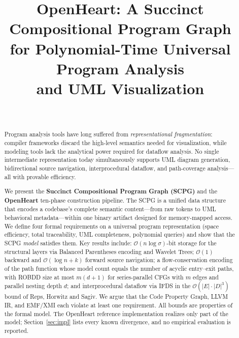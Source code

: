 \documentclass[journal,10pt,twoside]{IEEEtran}
\newcommand{\BigO}{\mathcal{O}}
\begin{document}
\title{OpenHeart: A Succinct Compositional Program Graph\\
for Polynomial-Time Universal Program Analysis\\
and UML Visualization}

\author{%
\\
}

\maketitle

\begin{abstract}
Program analysis tools have long suffered from
\textit{representational fragmentation}: compiler frameworks
discard the high-level semantics needed for visualization,
while modeling tools lack the analytical power required for
dataflow analysis.  No single intermediate representation
today simultaneously supports UML diagram generation,
bidirectional source navigation, interprocedural dataflow,
and path-coverage analysis---all with provable efficiency.

We present the \textbf{Succinct Compositional Program Graph
(SCPG)} and the \textbf{OpenHeart} ten-phase construction
pipeline.  The SCPG is a unified data structure that encodes
a codebase's complete semantic content---from raw tokens to
UML behavioral metadata---within one binary artifact designed
for memory-mapped access.  We define four formal requirements
on a universal program representation (space efficiency, total
traceability, UML completeness, polynomial queries) and show
that the SCPG \emph{model} satisfies them.  Key results include:
$\BigO(n\log\sigma)$-bit storage for the structural layers via
Balanced Parentheses encoding and Wavelet Trees;
$\BigO(1)$ backward and $\BigO(\log n + k)$ forward source
navigation; a flow-conservation encoding of the path function
whose model count equals the number of acyclic entry--exit
paths, with ROBDD size at most $m(d+1)$ for series-parallel
CFGs with $m$ edges and parallel nesting depth $d$; and
interprocedural dataflow via IFDS in the
$\BigO(|E|\cdot|D|^3)$ bound of Reps, Horwitz and Sagiv.
We argue that the Code Property Graph, LLVM IR, and EMF/XMI
each violate at least one requirement.  All bounds are
properties of the formal model.  The OpenHeart reference
implementation realizes only part of the model;
Section~\ref{sec:impl} lists every known divergence, and no
empirical evaluation is reported.
\end{abstract}
\end{document}
